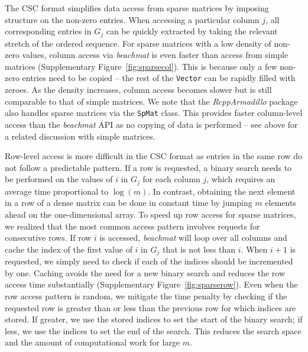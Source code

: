 \documentclass{article}
\newcommand{\beachmat}{\textit{beachmat}}
\newcommand{\code}[1]{\texttt{#1}}
\begin{document}

The CSC format simplifies data access from sparse matrices by imposing structure on the non-zero entries.
When accessing a particular column $j$, all corresponding entries in $G_j$ can be quickly extracted by taking the relevant stretch of the ordered sequence.
For sparse matrices with a low density of non-zero values, column access via \beachmat{} is even faster than access from simple matrices (Supplementary Figure~\ref{fig:sparsecol}).
This is because only a few non-zero entries need to be copied -- the rest of the \code{Vector} can be rapidly filled with zeroes.
As the density increases, column access becomes slower but is still comparable to that of simple matrices.
We note that the \textit{RcppArmadillo} package \cite{eddelbuettel2014arma} also handles sparse matrices via the \code{SpMat} class.
This provides faster column-level access than the \beachmat{} API as no copying of data is performed -- see above for a related discussion with simple matrices.

Row-level access is more difficult in the CSC format as entries in the same row do not follow a predictable pattern.
If a row is requested, a binary search needs to be performed on the values of $i$ in $G_j$ for each column $j$, which requires an average time proportional to $\log(m)$.
In contrast, obtaining the next element in a row of a dense matrix can be done in constant time by jumping $m$ elements ahead on the one-dimensional array.
To speed up row access for sparse matrices, we realized that the most common access pattern involves requests for consecutive rows.
If row $i$ is accessed, \beachmat{} will loop over all columns and cache the index of the first value of $i$ in $G_j$ that is not less than $i$.
When $i+1$ is requested, we simply need to check if each of the indices should be incremented by one.
Caching avoids the need for a new binary search and reduces the row access time substantially (Supplementary Figure~\ref{fig:sparserow}).
Even when the row access pattern is random, we mitigate the time penalty by checking if the requested row is greater than or less than the previous row for which indices are stored.
If greater, we use the stored indices to set the start of the binary search; if less, we use the indices to set the end of the search. 
This reduces the search space and the amount of computational work for large $m$.

\end{document}
